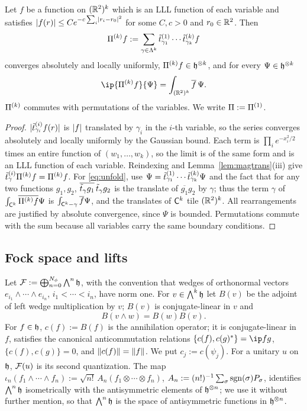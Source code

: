 \begin{lemma}\label{lem:unfold}
Let $f$ be a function on $(\mathbb{R}^2)^k$ which is an LLL function of each variable and satisfies
$\lvert f(r)\rvert\le Ce^{-c\sum_i\lvert r_i-r_0\rvert^2}$ for some $C,c>0$ and $r_0\in\mathbb{R}^2$. Then
\[
\Pi^{(k)}f:=\sum_{\gamma\in\Lambda^k}\tilde t^{(1)}_{\gamma_1}\cdots\tilde t^{(k)}_{\gamma_k}f
\]
converges absolutely and locally uniformly, $\Pi^{(k)}f\in\mathfrak{h}^{\otimes k}$, and for every $\Psi\in\mathfrak{h}^{\otimes k}$
\begin{equation}\label{eq:unfold}
\ip{\Pk^{(k)}f}{\Psi}=\int_{(\R^2)^k}\overline f\,\Psi .
\end{equation}
$\Pi^{(k)}$ commutes with permutations of the variables. We write $\Pi:=\Pi^{(1)}$.
\end{lemma}

\begin{proof}
$\lvert\tilde t^{(i)}_{\gamma_i}f(r)\rvert$ is $\lvert f\rvert$ translated by $\gamma_i$ in the $i$-th variable, so the series converges
absolutely and locally uniformly by the Gaussian bound. Each term is $\prod_ie^{-x_i^2/2}$ times an entire function of
$(w_1,\dots,w_k)$, so the limit is of the same form and is an LLL function of each variable. Reindexing and
Lemma~\ref{lem:magtrans}(iii) give $\tilde t^{(i)}_\gamma\Pi^{(k)}f=\Pi^{(k)}f$. For \eqref{eq:unfold}, use
$\Psi=\tilde t^{(1)}_{\gamma_1}\cdots\tilde t^{(k)}_{\gamma_k}\Psi$ and the fact that for any two functions $g_1,g_2$,
$\overline{\tilde t_\gamma g_1}\,\tilde t_\gamma g_2$ is the translate of $\overline{g_1}g_2$ by $\gamma$; thus the term $\gamma$ of
$\int_{\mathsf{C}^k}\overline{\Pi^{(k)}f}\Psi$ is $\int_{\mathsf{C}^k-\gamma}\overline f\Psi$, and the translates of $\mathsf{C}^k$ tile
$(\mathbb{R}^2)^k$. All rearrangements are justified by absolute convergence, since $\Psi$ is bounded. Permutations commute
with the sum because all variables carry the same boundary conditions.
\end{proof}

\subsection{Fock space and lifts}\label{ssec:fock}

Let $\mathcal{F}:=\bigoplus_{n=0}^{N_{\phi}}\bigwedge^n\mathfrak{h}$, with the convention that wedges of orthonormal vectors
$e_{i_1}\wedge\cdots\wedge e_{i_n}$, $i_1<\cdots<i_n$, have norm one. For $v\in\bigwedge^k\mathfrak{h}$ let $B(v)$ be the adjoint
of left wedge multiplication by $v$; $B(v)$ is conjugate-linear in $v$ and
\begin{equation}\label{eq:Bwedge}
B(v\wedge w)=B(w)B(v).
\end{equation}
For $f\in\mathfrak{h}$, $c(f):=B(f)$ is the annihilation operator; it is conjugate-linear in $f$, satisfies the canonical
anticommutation relations $\{c(f),c(g)^*\}=\ip fg$, $\{c(f),c(g)\}=0$, and $\lVert c(f)\rVert=\lVert f\rVert$. We put
$c_j:=c(\psi_j)$. For a unitary $u$ on $\mathfrak{h}$, $\mathcal{F}(u)$ is its second quantization. The map
$\iota_n(f_1\wedge\cdots\wedge f_n):=\sqrt{n!}\,A_n(f_1\otimes\cdots\otimes f_n)$, $A_n:=(n!)^{-1}\sum_\sigma\operatorname{sgn}(\sigma)P_\sigma$,
identifies $\bigwedge^n\mathfrak{h}$ isometrically with the antisymmetric elements of $\mathfrak{h}^{\otimes n}$; we use it without
further mention, so that $\bigwedge^n\mathfrak{h}$ is the space of antisymmetric functions in $\mathfrak{h}^{\otimes n}$.


